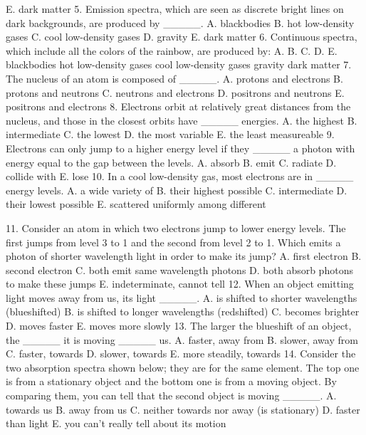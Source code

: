 E. dark matter
5. Emission spectra, which are seen as discrete bright lines on dark backgrounds, are produced
by _____.
A. blackbodies
B. hot low-density gases
C. cool low-density gases
D. gravity
E. dark matter
6. Continuous spectra, which include all the colors of the rainbow, are produced by:
A.
B.
C.
D.
E.
blackbodies
hot low-density gases
cool low-density gases
gravity
dark matter
7. The nucleus of an atom is composed of _____.
A. protons and electrons
B. protons and neutrons
C. neutrons and electrons
D. positrons and neutrons
E. positrons and electrons
8. Electrons orbit at relatively great distances from the nucleus, and those in the closest orbits
have _____ energies.
A. the highest
B. intermediate
C. the lowest
D. the most variable
E. the least measureable
9. Electrons can only jump to a higher energy level if they _____ a photon with energy equal to
the gap between the levels.
A. absorb
B. emit
C. radiate
D. collide with
E. lose
10. In a cool low-density gas, most electrons are in _____ energy levels.
A. a wide variety of
B. their highest possible
C. intermediate
D. their lowest possible
E. scattered uniformly among different


11. Consider an atom in which two electrons jump to lower energy levels. The first jumps from
level 3 to 1 and the second from level 2 to 1. Which emits a
photon of shorter wavelength light in order to make its
jump?
A. first electron
B. second electron
C. both emit same wavelength photons
D. both absorb photons to make these jumps
E. indeterminate, cannot tell
12. When an object emitting light moves away from us, its
light _____.
A. is shifted to shorter wavelengths (blueshifted)
B. is shifted to longer wavelengths (redshifted)
C. becomes brighter
D. moves faster
E. moves more slowly
13. The larger the blueshift of an object, the _____ it is moving _____ us.
A. faster, away from
B. slower, away from
C. faster, towards
D. slower, towards
E. more steadily, towards
14. Consider the two absorption spectra shown below; they are for the same element. The top
one is from a stationary object and the bottom one is from a moving object. By comparing
them, you can tell that the second object is moving _____.
A. towards us
B. away from us
C. neither towards nor away (is stationary)
D. faster than light
E. you can’t really tell about its motion


\endinput



